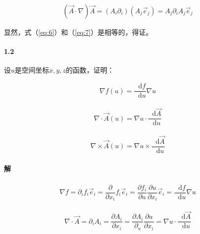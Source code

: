 \documentclass{article}
\newcommand*{\md}{\mathop{}\!\mathrm{d}}
\begin{document}
\begin{equation}
  \label{eq:7}
  \begin{aligned}
    \left( \vec{A} \cdot \nabla \right) \vec{A} = \left( A_i \partial_i \right) \left( A_j \vec{e}_j \right) = A_j \partial_i A_j \vec{e}_j
  \end{aligned}
\end{equation}

显然，式（\ref{eq:6}）和（\ref{eq:7}）是相等的，得证。

\paragraph{1.2}

设$u$是空间坐标$x,y,z$的函数，证明：

\begin{equation*}
  \begin{aligned}
    \nabla f \left( u \right) = \dfrac{\md f}{\md u} \nabla u 
  \end{aligned}
\end{equation*}

\begin{equation*}
  \begin{aligned}
    \nabla \cdot \vec{A} \left( u \right) = \nabla u \cdot \dfrac{\md \vec{A}}{\md u} 
  \end{aligned}
\end{equation*}

\begin{equation*}
  \begin{aligned}
    \nabla \times \vec{A} \left( u \right) = \nabla u \times \dfrac{\md \vec{A}}{\md u} 
  \end{aligned}
\end{equation*}

\paragraph{解}

\begin{equation*}
  \begin{aligned}
    \nabla f = \partial_i f_i \vec{e}_i = \dfrac{\partial}{\partial x_i} f_i \vec{e}_i = \dfrac{\partial f_i}{\partial u} \dfrac{\partial u}{\partial x_i} \vec{e}_i = \dfrac{\md f}{\md u} \nabla u     
  \end{aligned}
\end{equation*}

\begin{equation*}
  \begin{aligned}
    \nabla \cdot \vec{A} = \partial_i A_i = \dfrac{\partial A_i}{\partial x_i} = \dfrac{\partial A_i}{\partial _u} \dfrac{\partial u}{\partial x_i} = \nabla u \cdot \dfrac{\md \vec{A}}{\md u}   
  \end{aligned}
\end{equation*}
\end{document}
